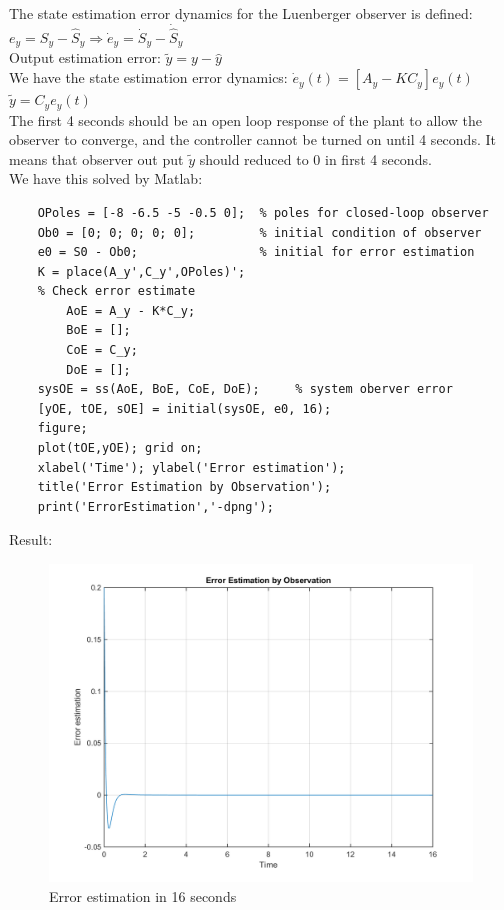 \documentclass[14pt,a4paper]{article}
\begin{document}
	The state estimation error dynamics for the Luenberger observer is defined: \\
	\hspace*{2cm} $ e_y = S_y - \hat{S}_y \Rightarrow \dot{e}_y = \dot{S}_y - \dot{\hat{S}}_y $ \\
	Output estimation error: $ \tilde{y} = y - \hat{y} $ \\
	We have the state estimation error dynamics: \hspace{0.5cm} $ \dot{e}_y(t) = [A_y - KC_y]e_y(t) $ \\
	\hspace*{9cm} $ \tilde{y} = C_ye_y(t) $ \\
	The first 4 seconds should be an open loop response of the plant to allow the observer to converge, and the controller cannot be turned on until 4 seconds. It means that observer out put $\tilde{y}$ should reduced to 0 in first 4 seconds. \\
	We have this solved by Matlab: 
	\begin{lstlisting}
	OPoles = [-8 -6.5 -5 -0.5 0];  % poles for closed-loop observer
	Ob0 = [0; 0; 0; 0; 0];         % initial condition of observer
	e0 = S0 - Ob0;                 % initial for error estimation
	K = place(A_y',C_y',OPoles)';
	% Check error estimate
		AoE = A_y - K*C_y;
		BoE = [];
		CoE = C_y;
		DoE = [];
	sysOE = ss(AoE, BoE, CoE, DoE);     % system oberver error
	[yOE, tOE, sOE] = initial(sysOE, e0, 16);
	figure;
	plot(tOE,yOE); grid on;
	xlabel('Time'); ylabel('Error estimation');
	title('Error Estimation by Observation');
	print('ErrorEstimation','-dpng');
	\end{lstlisting}
	\pagebreak
	
	Result: 
		\begin{figure}[htp]
			\begin{center}
				\includegraphics[scale = 0.8]{ErrorEstimation.png}
				\caption{Error estimation in 16 seconds}
			\end{center}
		\end{figure} \\
	
\end{document}

